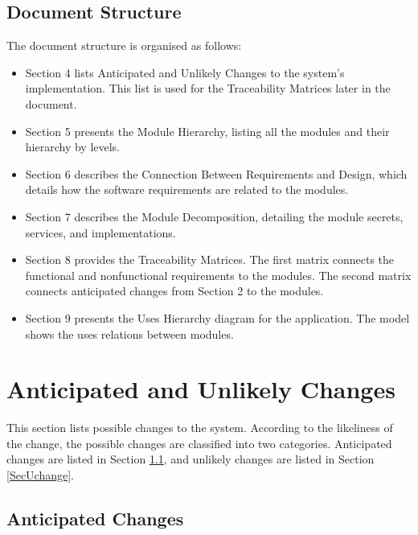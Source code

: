 \documentclass[12pt, titlepage]{article}
\begin{document}
\subsection{Document Structure}
	The document structure is organised as follows:
\begin{itemize}

\item Section 4 lists Anticipated and Unlikely Changes to the system's implementation. This list is used for the Traceability Matrices later in the document.

\item Section 5 presents the Module Hierarchy, listing all the modules and their hierarchy by levels. 

\item Section 6 describes the Connection Between Requirements and Design, which details how the software requirements are related to the modules. 

\item Section 7 describes the Module Decomposition, detailing the module secrets, services, and implementations. 

\item Section 8 provides the Traceability Matrices. The first matrix connects the functional and nonfunctional requirements to the modules. The second matrix connects anticipated changes from Section 2 to the modules.

\item Section 9 presents the Uses Hierarchy diagram for the application. The model shows the uses relations between modules.

\end{itemize}	

\section{Anticipated and Unlikely Changes} \label{SecChange}

This section lists possible changes to the system. According to the likeliness
of the change, the possible changes are classified into two
categories. Anticipated changes are listed in Section \ref{SecAchange}, and
unlikely changes are listed in Section \ref{SecUchange}.

\subsection{Anticipated Changes} \label{SecAchange}
\end{document}
